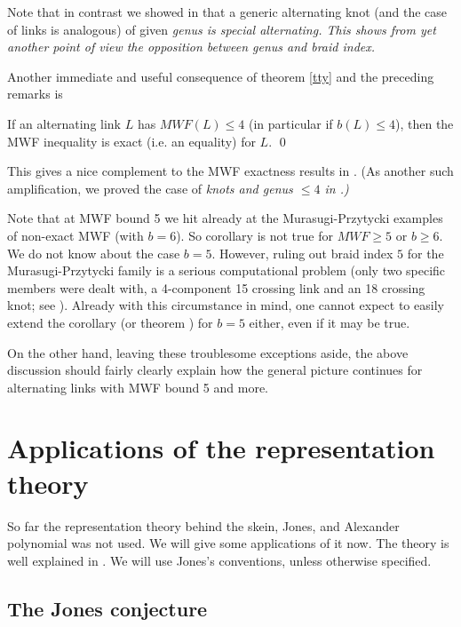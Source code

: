 \begin{rem}
Note that in contrast we showed in \cite{SV} that a generic
alternating knot (and the case of links is analogous) of given
\em{genus is} special alternating. This shows from yet another
point of view the opposition between genus and braid index.
\end{rem}

Another immediate and useful consequence of theorem \ref{tty}
and the preceding remarks is

\begin{corr}\label{cft}
If an alternating link $L$ has $MWF(L)\le 4$ (in particular
if $b(L)\le 4$), then the MWF inequality is exact
(i.e. an equality) for $L$. \qed
\end{corr}

This gives a nice complement to the MWF exactness results in
\cite{Murasugi,MurPrz2}. (As another such amplification, we 
proved the case of \em{knots} and genus $\le 4$ in \cite{gener}.)

Note that at MWF bound 5 we hit already at the Murasugi-Przytycki
examples \cite{MurPrz2} of non-exact MWF (with $b=6$). So corollary
 is not true for $MWF\ge 5$ or $b\ge 6$. We do
not know about the case $b=5$. However, ruling out braid index
$5$ for the Murasugi-Przytycki family is a serious computational
problem (only two specific members were dealt with, a 4-component
15 crossing link and an 18 crossing knot; see \cite[\S 19]
{MurPrz2}). Already with this circumstance in mind,
one cannot expect to easily extend the corollary (or theorem
) for $b=5$ either, even if it may be true.

On the other hand, leaving these troublesome exceptions aside,
the above discussion should fairly clearly explain how
the general picture continues for alternating links with MWF
bound 5 and more.

\section{Applications of the representation theory\label{SBurau}}

So far the representation theory behind the skein, Jones, and
Alexander polynomial was not used. We will give some applications
of it now. The theory is well explained in \cite{Jones}. We will
use Jones's conventions, unless otherwise specified.

\subsection{The Jones conjecture\label{SJS}}

